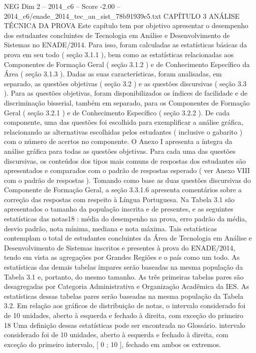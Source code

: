 \begin{textsample}{NEG Dim 2 – 2014\_c6 – Score -2.00 – 2014\_c6/enade\_2014\_tec\_an\_sist\_78b91939e5.txt}  \label{ex:f2_neg_201}
CAPÍTULO 3 ANÁLISE TÉCNICA DA PROVA Este capítulo tem por objetivo apresentar o desempenho dos estudantes concluintes de Tecnologia em Análise e Desenvolvimento de Sistemas no ENADE/2014.
Para isso, foram calculadas as estatísticas básicas da prova em seu todo ( seção 3.1.1 ), bem como as estatísticas relacionadas aos Componentes de Formação Geral ( seção 3.1.2 ) e de Conhecimento Específico da Área ( seção 3.1.3 ).
Dadas as suas características, foram analisadas, em separado, as questões objetivas ( seção 3.2 ) e as questões discursivas ( seção 3.3 ).
Para as questões objetivas, foram disponibilizados os índices de facilidade e de discriminação bisserial, também em separado, para os Componentes de Formação Geral ( seção 3.2.1 ) e de Conhecimento Específico ( seção 3.2.2 ).
De cada componente, uma das questões foi escolhida para exemplificar a análise gráfica, relacionando as alternativas escolhidas pelos estudantes ( inclusive o gabarito ) com o número de acertos no componente.
O Anexo I apresenta a íntegra da análise gráfica para todas as questões objetivas.
Para cada uma das questões discursivas, os conteúdos dos tipos mais comuns de respostas dos estudantes são apresentados e comparados com o padrão de respostas esperado ( ver Anexo VIII com o padrão de respostas ).
Tomando como base as duas questões discursivas do Componente de Formação Geral, a seção 3.3.1.6 apresenta comentários sobre a correção das respostas com respeito à Língua Portuguesa.
Na Tabela 3.1 são apresentados o tamanho da população inscrita e de presentes, e as seguintes estatísticas das notas18 : média do desempenho na prova, erro padrão da média, desvio padrão, nota mínima, mediana e nota máxima.
Tais estatísticas contemplam o total de estudantes concluintes da Área de Tecnologia em Análise e Desenvolvimento de Sistemas inscritos e presentes à prova do ENADE/2014, tendo em vista as agregações por Grandes Regiões e o país como um todo.
As estatísticas das demais tabelas ímpares serão baseadas na mesma população da Tabela 3.1 e, portanto, do mesmo tamanho.
As três primeiras tabelas pares são desagregadas por Categoria Administrativa e Organização Acadêmica da IES.
As estatísticas dessas tabelas pares serão baseadas na mesma população da Tabela 3.2.
Em relação aos gráficos de distribuição de notas, o intervalo considerado foi de 10 unidades, aberto à esquerda e fechado à direita, com exceção do primeiro 18 Uma definição dessas estatísticas pode ser encontrada no Glossário. intervalo considerado foi de 10 unidades, aberto à esquerda e fechado à direita, com exceção do primeiro intervalo, [ 0 ; 10 ], fechado em ambos os extremos.

\end{textsample}
